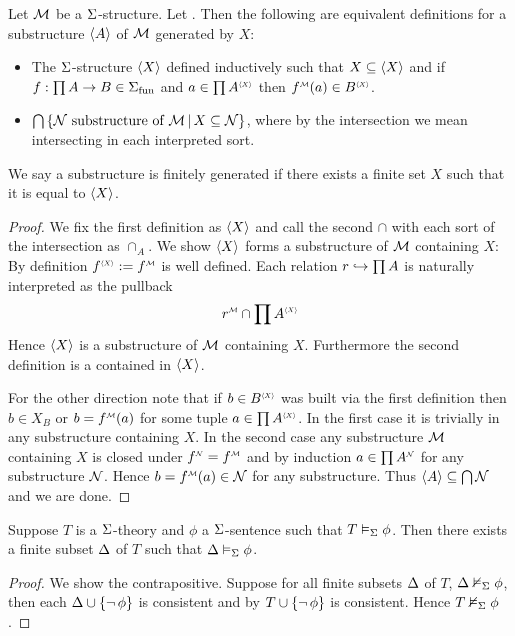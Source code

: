 \begin{dfn}
    Let $\mathcal{M}$ be a $\Sigma$-structure.
    Let .
    Then the following are equivalent definitions for a substructure $\langle A\rangle$
    of $\mathcal{M}$ generated by $X$:
    \begin{itemize}
        \item The $\Sigma$-structure $\langle X\rangle$ defined inductively such that 
        $X \subseteq \langle X\rangle$ and if $f : \prod A \to B \in {\Sigma}_\mathrm{fun}$ and 
        $a \in \prod \modintp{\<X\>}{A}$ then 
        $\mmintp{f}(a) \in \modintp{\<X\>}{B}$.
        \item $\bigcap \left\{\mathcal{N} \text{ substructure of } \mathcal{M} \,|\, X \subseteq \mathcal{N}\right\}$, 
            where by the intersection we mean intersecting 
            in each interpreted sort.
    \end{itemize}
    We say a substructure is finitely generated if there exists a finite set 
    $X$ such that it is equal to $\langle X\rangle$.
\end{dfn}
\begin{proof}
    We fix the first definition as $\langle X\rangle$ and call the second $\cap$
    with each sort of the intersection as $\cap_A$.
    We show $\langle X\rangle$ forms a substructure of $\mathcal{M}$ containing $X$:
    By definition $\modintp{\<X\>}{f} := \mmintp{f}$ is well defined.
    Each relation $r \hookrightarrow \prod A$ is naturally 
    interpreted as the pullback 
    \[ 
        \mmintp{r} \cap \modintp{\<X\>}{\prod A}
    \]
    Hence $\langle X\rangle$ is a substructure of $\mathcal{M}$ containing $X$.
    Furthermore the second definition is a contained in $\langle X\rangle$.

    For the other direction note that if $b \in \modintp{\<X\>}{B}$ 
    was built via the first definition then $b \in X_B$ or
    $b = \mmintp{f}(a)$ for some tuple $a \in \prod \modintp{\<X\>}{A}$.
    In the first case it is trivially in any substructure containing $X$.
    In the second case any substructure $\mathcal{M}$ containing $X$ 
    is closed under $\nnintp{f} = \mmintp{f}$ and by induction
    $a \in \prod \nnintp{A}$ for any substructure $\mathcal{N}$.
    Hence $b = \mmintp{f}(a) \in \NN$ for any substructure.
    Thus $\langle A\rangle \subseteq \bigcap \mathcal{N}$ and we are done.
\end{proof}

\begin{lem}
    Suppose $T$ is a $\Sigma$-theory and $\phi$ a $\Sigma$-sentence such that 
    $T \vDash_{\Sigma} \phi$. 
    Then there exists a finite subset $\Delta$ of $T$ such that 
    $\Delta \vDash_{\Sigma} \phi$.
\end{lem}
\begin{proof}
    We show the contrapositive.
    Suppose for all finite subsets $\Delta$ of $T$, $\Delta \nvDash_{\Sigma} \phi$,
    then each $\Delta \cup \left\{\neg\, \phi\right\}$ is consistent and
    by  $T \cup \left\{\neg\, \phi\right\}$ is consistent.
    Hence $T \nvDash_{\Sigma} \phi$.
\end{proof}

